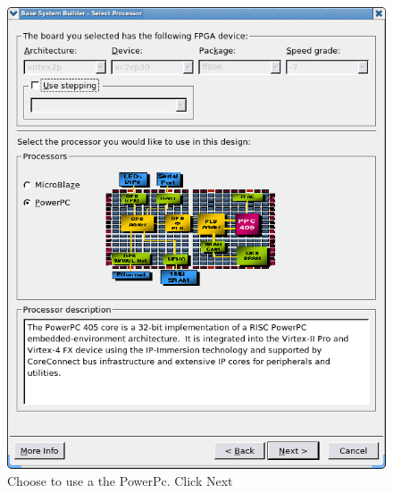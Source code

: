 \documentclass[a4paper,oneside]{memoir}
\begin{document}
\begin{figure}[H]
\centering
\includegraphics[scale=0.4]{BSB3}
\caption{Choose to use a the PowerPc. Click Next\label{fig:BSB3}}
\end{figure}
\end{document}
